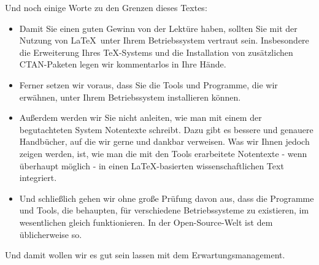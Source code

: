 Und noch einige Worte zu den Grenzen dieses Textes:
\begin{itemize}
  \item Damit Sie einen guten Gewinn von der Lektüre haben, sollten Sie mit der
  Nutzung von \LaTeX\ unter Ihrem Betriebssystem vertraut sein.
  Insbesondere die Erweiterung Ihres \TeX-Systems und die Installation von
  zusätzlichen CTAN-Paketen legen wir kommentarlos in Ihre Hände.
  \item Ferner setzen wir voraus, dass Sie die Tools und Programme, die wir
  erwähnen, unter Ihrem Betriebssystem installieren können.
  \item Außerdem werden wir Sie nicht anleiten, wie man mit einem der
  begutachteten System Notentexte schreibt. Dazu gibt es bessere und genauere
  Handbücher, auf die wir gerne und dankbar verweisen. Was wir Ihnen jedoch
  zeigen werden, ist, wie man die mit den Tools erarbeitete Notentexte - wenn
  überhaupt möglich - in einen \LaTeX-basierten wissenschaftlichen Text
  integriert.
  \item Und schließlich gehen wir ohne große Prüfung davon aus, dass die
  Programme und Tools, die behaupten, für verschiedene Betriebssysteme zu
  existieren, im wesentlichen gleich funktionieren. In der Open-Source-Welt ist
  dem üblicherweise so.
\end{itemize}

Und damit wollen wir es gut sein lassen mit dem Erwartungsmanagement.



%
